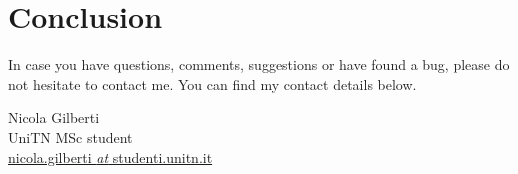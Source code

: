 \chapter{Conclusion}\label{ch:conclusion}
In case you have questions, comments, suggestions or have found a bug, please do not hesitate to contact me. You can find my contact details below.
  \begin{center}
    Nicola Gilberti\\
    UniTN MSc student\\
    
    \href{mailto:nicola.gilberti@studenti.unitn.it}{\footnotesize nicola.gilberti \textit{at} studenti.unitn.it}
  \end{center}

\newpage